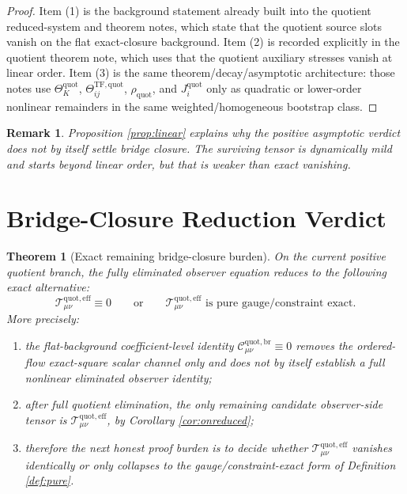 \documentclass[11pt]{article}
\newcommand{\EffAux}{\mathcal T_{\mu\nu}^{\mathrm{quot,eff}}}
\newcommand{\BridgeCorr}{\mathcal C_{\mu\nu}^{\mathrm{quot,br}}}
\newtheorem{remark}{Remark}
\newtheorem{theorem}{Theorem}
\begin{document}
\begin{proof}
Item (1) is the background statement already built into the quotient reduced-system and theorem notes, which state that the quotient source slots vanish on the flat exact-closure background. Item (2) is recorded explicitly in the quotient theorem note, which uses that the quotient auxiliary stresses vanish at linear order. Item (3) is the same theorem/decay/asymptotic architecture: those notes use \(\Theta_K^{\mathrm{quot}}\), \(\Theta_{ij}^{\mathrm{TF,quot}}\), \(\rho_{\mathrm{quot}}\), and \(J_i^{\mathrm{quot}}\) only as quadratic or lower-order nonlinear remainders in the same weighted/homogeneous bootstrap class.
\end{proof}

\begin{remark}
Proposition \ref{prop:linear} explains why the positive asymptotic verdict does not by itself settle bridge closure. The surviving tensor is dynamically mild and starts beyond linear order, but that is weaker than exact vanishing.
\end{remark}

\section{Bridge-Closure Reduction Verdict}

\begin{theorem}[Exact remaining bridge-closure burden]
\label{thm:burden}
On the current positive quotient branch, the fully eliminated observer equation reduces to the following exact alternative:
\begin{equation}
\EffAux\equiv 0
\qquad\text{or}\qquad
\EffAux \text{ is pure gauge/constraint exact.}
\label{eq:alternative}
\end{equation}
More precisely:
\begin{enumerate}
    \item the flat-background coefficient-level identity \(\BridgeCorr\equiv 0\) removes the ordered-flow exact-square scalar channel only and does not by itself establish a full nonlinear eliminated observer identity;
    \item after full quotient elimination, the only remaining candidate observer-side tensor is \(\EffAux\), by Corollary \ref{cor:onreduced};
    \item therefore the next honest proof burden is to decide whether \(\EffAux\) vanishes identically or only collapses to the gauge/constraint-exact form of Definition \ref{def:pure}.
\end{enumerate}
\end{theorem}
\end{document}
